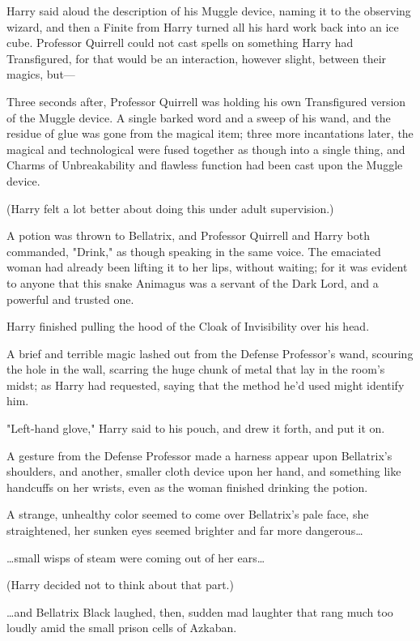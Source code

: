 Harry said aloud the description of his Muggle device, naming it to the
observing wizard, and then a Finite from Harry turned all his hard work back
into an ice cube. Professor Quirrell could not cast spells on something Harry
had Transfigured, for that would be an interaction, however slight, between
their magics, but---

Three seconds after, Professor Quirrell was holding his own Transfigured
version of the Muggle device. A single barked word and a sweep of his wand, and
the residue of glue was gone from the magical item; three more incantations
later, the magical and technological were fused together as though into a
single thing, and Charms of Unbreakability and flawless function had been cast
upon the Muggle device.

(Harry felt a lot better about doing this under adult supervision.)

A potion was thrown to Bellatrix, and Professor Quirrell and Harry both
commanded, "Drink," as though speaking in the same voice. The emaciated woman
had already been lifting it to her lips, without waiting; for it was evident to
anyone that this snake Animagus was a servant of the Dark Lord, and a powerful
and trusted one.

Harry finished pulling the hood of the Cloak of Invisibility over his head.

A brief and terrible magic lashed out from the Defense Professor's wand,
scouring the hole in the wall, scarring the huge chunk of metal that lay in the
room's midst; as Harry had requested, saying that the method he'd used might
identify him.

"Left-hand glove," Harry said to his pouch, and drew it forth, and put it on.

A gesture from the Defense Professor made a harness appear upon Bellatrix's
shoulders, and another, smaller cloth device upon her hand, and something like
handcuffs on her wrists, even as the woman finished drinking the potion.

A strange, unhealthy color seemed to come over Bellatrix's pale face, she
straightened, her sunken eyes seemed brighter and far more dangerous{\ldots}

{\ldots}small wisps of steam were coming out of her ears{\ldots}

(Harry decided not to think about that part.)

{\ldots}and Bellatrix Black laughed, then, sudden mad laughter that rang much
too loudly amid the small prison cells of Azkaban.

